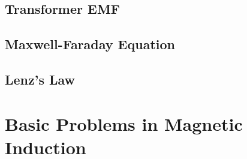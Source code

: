 \documentclass[class=article, crop=false, 12pt]{standalone}
\begin{document}
\subsection{Transformer EMF}

\subsection{Maxwell-Faraday Equation}

\subsection{Lenz's Law}


\linesep
\section{Basic Problems in Magnetic Induction}


\theend
\end{document}
